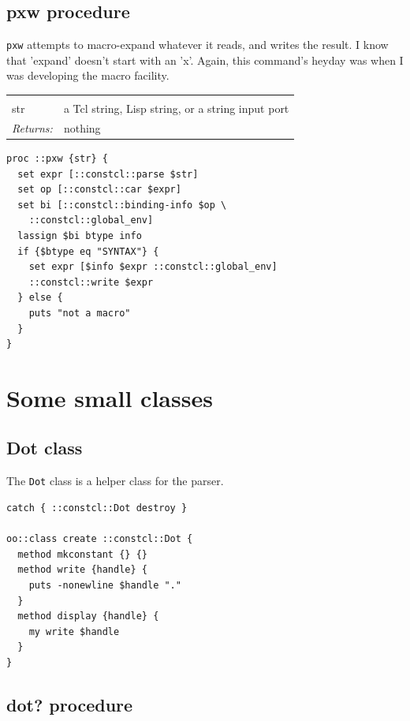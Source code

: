\documentclass[twoside,9pt]{report}
\begin{document}
\subsection{pxw procedure}
\label{pxw-procedure}


\texttt{pxw} attempts to macro-expand whatever it reads, and writes the result. I know that 'expand' doesn't start with an 'x'. Again, this command's heyday was when I was developing the macro facility.

\noindent\begin{tabular}{ |p{1.9cm} p{8cm}| }
\hline
\rowcolor[HTML]{CCCCCC} \multicolumn{2}{|l|}{\bf pxw (internal)} \\
str & a Tcl string, Lisp string, or a string input port \\
\textit{Returns:} & nothing \\
\hline
\end{tabular}
\begin{lstlisting}
proc ::pxw {str} {
  set expr [::constcl::parse $str]
  set op [::constcl::car $expr]
  set bi [::constcl::binding-info $op \
    ::constcl::global_env]
  lassign $bi btype info
  if {$btype eq "SYNTAX"} {
    set expr [$info $expr ::constcl::global_env]
    ::constcl::write $expr
  } else {
    puts "not a macro"
  }
}
\end{lstlisting}
\section{Some small classes}
\label{some-small-classes}
\subsection{Dot class}
\label{dot-class}


The \texttt{Dot} class is a helper class for the parser.

\begin{lstlisting}
catch { ::constcl::Dot destroy }

oo::class create ::constcl::Dot {
  method mkconstant {} {}
  method write {handle} {
    puts -nonewline $handle "."
  }
  method display {handle} {
    my write $handle
  }
}
\end{lstlisting}
\subsection{dot? procedure}
\label{dot?-procedure}
\end{document}
